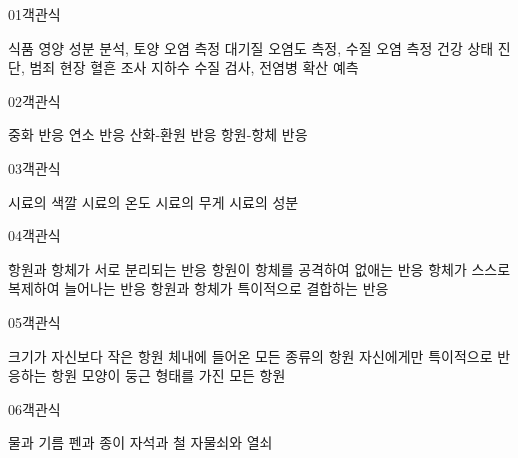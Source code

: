 \documentclass[fs9,seriesRus]{korfarm-base}
\begin{document}
\par\medskip
\kfBeginMC
\begin{kfQBlock}{01}{객관식}
\begin{kfChoices}
\kfChoice 식품 영양 성분 분석, 토양 오염 측정
\kfChoice 대기질 오염도 측정, 수질 오염 측정
\kfChoice 건강 상태 진단, 범죄 현장 혈흔 조사
\kfChoice 지하수 수질 검사, 전염병 확산 예측
\end{kfChoices}
\end{kfQBlock}
\begin{kfQBlock}{02}{객관식}
\begin{kfChoices}
\kfChoice 중화 반응
\kfChoice 연소 반응
\kfChoice 산화-환원 반응
\kfChoice 항원-항체 반응
\end{kfChoices}
\end{kfQBlock}
\begin{kfQBlock}{03}{객관식}
\begin{kfChoices}
\kfChoice 시료의 색깔
\kfChoice 시료의 온도
\kfChoice 시료의 무게
\kfChoice 시료의 성분
\end{kfChoices}
\end{kfQBlock}
\begin{kfQBlock}{04}{객관식}
\begin{kfChoices}
\kfChoice 항원과 항체가 서로 분리되는 반응
\kfChoice 항원이 항체를 공격하여 없애는 반응
\kfChoice 항체가 스스로 복제하여 늘어나는 반응
\kfChoice 항원과 항체가 특이적으로 결합하는 반응
\end{kfChoices}
\end{kfQBlock}
\begin{kfQBlock}{05}{객관식}
\begin{kfChoices}
\kfChoice 크기가 자신보다 작은 항원
\kfChoice 체내에 들어온 모든 종류의 항원
\kfChoice 자신에게만 특이적으로 반응하는 항원
\kfChoice 모양이 둥근 형태를 가진 모든 항원
\end{kfChoices}
\end{kfQBlock}
\begin{kfQBlock}{06}{객관식}
\begin{kfChoices}
\kfChoice 물과 기름
\kfChoice 펜과 종이
\kfChoice 자석과 철
\kfChoice 자물쇠와 열쇠
\end{kfChoices}
\end{kfQBlock}
\end{document}
